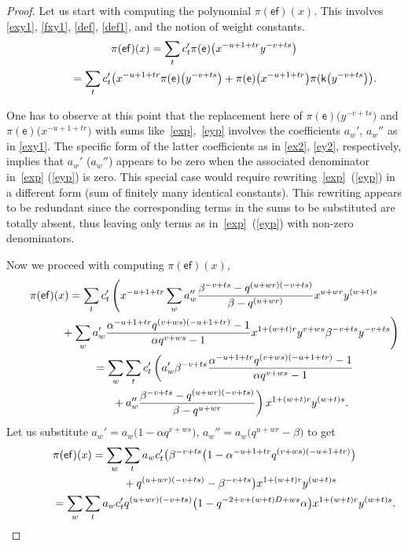 \documentclass[10pt,a4paper]{amsart}
\numberwithin{equation}{section}
\begin{document}
\begin{proof} Let us start with computing the polynomial $\pi(\mathsf{ef})(x)$. This involves \eqref{exy1}, \eqref{fxy1}, \eqref{def}, \eqref{def1}, and the notion of weight constants.
\begin{gather*}
\pi(\mathsf{ef})(x)=\sum_tc_t'\pi(\mathsf{e})\big(x^{-u+1+tr}y^{-v+ts}\big)\\
\hphantom{\pi(\mathsf{ef})(x)}{} =\sum_tc_t'\big(x^{-u+1+tr}\pi(\mathsf{e})\big(y^{-v+ts}\big)+\pi(\mathsf{e})\big(x^{-u+1+tr}\big)\pi(\mathsf{k}\big(y^{-v+ts}\big)\big).
\end{gather*}

One has to observe at this point that the replacement here of $\pi(\mathsf{e})\big(y^{-v+ts}\big)$ and $\pi(\mathsf{e})\big(x^{-u+1+tr}\big)$ with sums like~\eqref{exp},~\eqref{eyp} involves the coefficients $a_w'$, $a_w''$ as in \eqref{exy1}. The specific form of the latter coefficients as in \eqref{ex2}, \eqref{ey2}, respectively, implies that $a_w'$ ($a_w''$) appears to be zero when the associated denominator in~\eqref{exp} (\eqref{eyp}) is zero. This special case would require rewri\-ting~\eqref{exp}~(\eqref{eyp}) in a different form (sum of finitely many identical constants). This rewriting appears to be redundant since the corresponding terms in the sums to be substituted are totally absent, thus leaving only terms as in~\eqref{exp}~(\eqref{eyp}) with non-zero denominators.

Now we proceed with computing $\pi(\mathsf{ef})(x)$,
\begin{gather*}
\pi(\mathsf{ef})(x)=\sum_tc_t'\left(x^{-u+1+tr}\sum_wa_w''
\frac{\beta^{-v+ts}-q^{(u+wr)(-v+ts)}}{\beta-q^{(u+wr)}}x^{u+wr}y^{(w+t)s} \right.\\
 \left.\hphantom{\pi(\mathsf{ef})(x)=}{} +\sum_wa_w'\frac{\alpha^{-u+1+tr}q^{(v+ws)(-u+1+tr)}-1}{\alpha q^{v+ws}-1}x^{1+(w+t)r}y^{v+ws}\beta^{-v+ts}y^{-v+ts}\right)\\
\hphantom{\pi(\mathsf{ef})(x)}{} =\sum_w\sum_tc_t'\left(a_w'\beta^{-v+ts} \frac{\alpha^{-u+1+tr}q^{(v+ws)(-u+1+tr)}-1}{\alpha q^{v+ws}-1} \right.\\
 \left. \hphantom{\pi(\mathsf{ef})(x)=}{} +a_w''\frac{\beta^{-v+ts}-q^{(u+wr)(-v+ts)}}{\beta-q^{u+wr}}\right) x^{1+(w+t)r}y^{(w+t)s}.
\end{gather*}
Let us substitute $a_w'=a_w\big(1-\alpha q^{v+ws}\big)$, $a_w''=a_w\big(q^{u+wr}-\beta\big)$ to get
\begin{gather*}
\pi(\mathsf{ef})(x)=\sum_w\sum_ta_wc_t' \big(\beta^{-v+ts}\big(1-\alpha^{-u+1+tr}q^{(v+ws)(-u+1+tr)}\big)\\
\hphantom{\pi(\mathsf{ef})(x)=}{} +q^{(u+wr)(-v+ts)}-\beta^{-v+ts}\big)x^{1+(w+t)r}y^{(w+t)s}\\
\hphantom{\pi(\mathsf{ef})(x)}{} =\sum_w\sum_ta_wc_t'q^{(u+wr)(-v+ts)}\big(1-q^{-2+v+(w+t)D+ws}\alpha\big)x^{1+(w+t)r}y^{(w+t)s}.
\end{gather*}


\end{proof}
\end{document}
